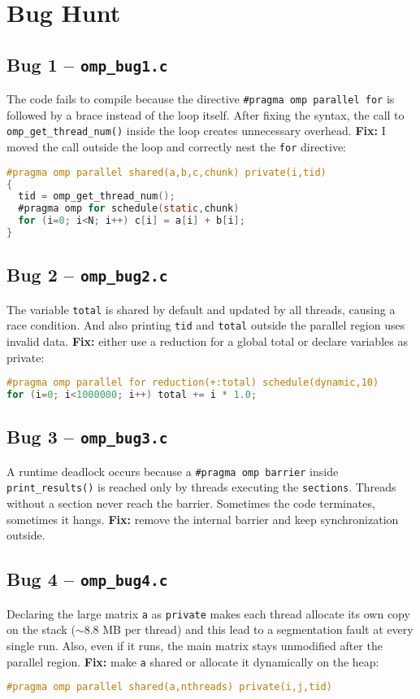 \section{Bug Hunt }

\subsection*{Bug 1 – \texttt{omp\_bug1.c}}
The code fails to compile because the directive
\texttt{\#pragma omp parallel for} is followed by a brace instead of the loop itself.
After fixing the syntax, the call to \texttt{omp\_get\_thread\_num()} inside the loop
creates unnecessary overhead.  
\textbf{Fix:} I moved the call outside the loop and correctly nest the \texttt{for} directive:
\begin{lstlisting}[language=C]
#pragma omp parallel shared(a,b,c,chunk) private(i,tid)
{
  tid = omp_get_thread_num();
  #pragma omp for schedule(static,chunk)
  for (i=0; i<N; i++) c[i] = a[i] + b[i];
}
\end{lstlisting}

\subsection*{Bug 2 – \texttt{omp\_bug2.c}}
The variable \texttt{total} is shared by default and updated by all threads,
causing a race condition. And also printing \texttt{tid} and \texttt{total}
outside the parallel region uses invalid data.  
\textbf{Fix:} either use a reduction for a global total or declare variables as private:
\begin{lstlisting}[language=C]
#pragma omp parallel for reduction(+:total) schedule(dynamic,10)
for (i=0; i<1000000; i++) total += i * 1.0;
\end{lstlisting}

\subsection*{Bug 3 – \texttt{omp\_bug3.c}}
A runtime deadlock occurs because a \texttt{\#pragma omp barrier}
inside \texttt{print\_results()} is reached only by threads executing the
\texttt{sections}. Threads without a section never reach the barrier.
Sometimes the code terminates, sometimes it hangs.  
\textbf{Fix:} remove the internal barrier and keep synchronization outside.

\subsection*{Bug 4 – \texttt{omp\_bug4.c}}
Declaring the large matrix \texttt{a} as \texttt{private} makes each thread allocate
its own copy on the stack ($\sim$8.8 MB per thread) and this lead to a segmentation fault at every single run.
Also, even if it runs, the main matrix stays unmodified after the parallel region.  
\textbf{Fix:} make \texttt{a} shared or allocate it dynamically on the heap:
\begin{lstlisting}[language=C]
#pragma omp parallel shared(a,nthreads) private(i,j,tid)
\end{lstlisting}


